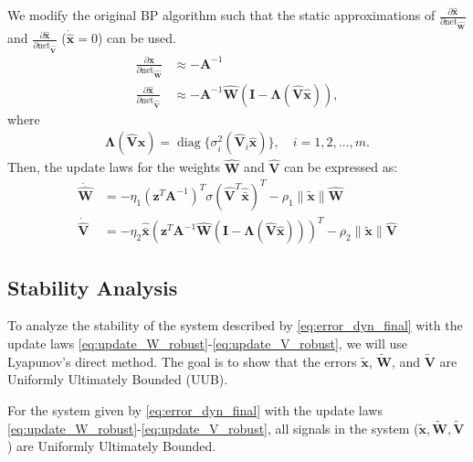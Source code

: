 \documentclass[10pt,twocolumn]{ICCAS}
\newcommand{\xtilde}{\tilde{\bm{x}}}
\newcommand{\xhatbar}{\hat{\bar{\bm{x}}}}
\newcommand{\Wtilde}{\tilde{\mathbf{W}}}
\newcommand{\What}{\hat{\mathbf{W}}}
\newcommand{\Vtilde}{\tilde{\mathbf{V}}}
\newcommand{\Vhat}{\hat{\mathbf{V}}}
\newcommand{\diag}{\operatorname{diag}}
\begin{document}
We modify the original BP algorithm such that the static approximations of $\frac{\partial \hat{\bm{x}}}{\partial \text{net}_{\hat{\mathbf{W}}}}$ and $\frac{\partial \hat{\bm{x}}}{\partial \text{net}_{\hat{\mathbf{V}}}}$ ($\dot{\hat{\bm{x}}} = 0$) can be used.
\begin{align*}
    \frac{\partial \hat{\bm{x}}}{\partial \text{net}_{\hat{\mathbf{W}}}} &\approx -\mathbf{A}^{-1} \nonumber \\
    \frac{\partial \hat{\bm{x}}}{\partial \text{net}_{\hat{\mathbf{V}}}} &\approx -\mathbf{A}^{-1}\hat{\mathbf{W}}(\mathbf{I} - \mathbf{\Lambda}(\hat{\mathbf{V}}\hat{\bm{x}})), 
\end{align*}
where
\begin{align*}
    \mathbf{\Lambda}(\hat{\mathbf{V}}\hat{\bm{x}}) = \diag\{\sigma_i^2(\hat{\mathbf{V}}_i\hat{\bm{x}})\}, \quad i=1,2,\dots,m.
\end{align*}
Then, the update laws for the weights $\What$ and $\Vhat$ can be expressed as:
\begin{align}
    \dot{\What} &= -\eta_1 \left(\bm{z}^{T} \bm{A}^{-1}  \right)^{T} \sigma(\Vhat^T\xhatbar)^T - \rho_1 \|\xtilde\| \What \label{eq:update_W_robust} \\
    \dot{\Vhat} &= -\eta_2 \xhatbar \left( \bm{z}^T \bm{A}^{-1} \What (\mathbf{I} - \mathbf{\Lambda}({\mathbf{\hat{V}}}{\bm{\hat{x}}})) \right)^T - \rho_2 \|\xtilde\| \Vhat \label{eq:update_V_robust}
\end{align}

\subsection{Stability Analysis}

To analyze the stability of the system described by \eqref{eq:error_dyn_final} with the update laws \eqref{eq:update_W_robust}-\eqref{eq:update_V_robust}, we will use Lyapunov's direct method. The goal is to show that the errors $\xtilde$, $\Wtilde$, and $\Vtilde$ are Uniformly Ultimately Bounded (UUB).
\begin{theorem}
For the system given by \eqref{eq:error_dyn_final} with the update laws \eqref{eq:update_W_robust}-\eqref{eq:update_V_robust}, all signals in the system ($\xtilde, \Wtilde, \Vtilde$) are Uniformly Ultimately Bounded.
\end{theorem}
\end{document}
